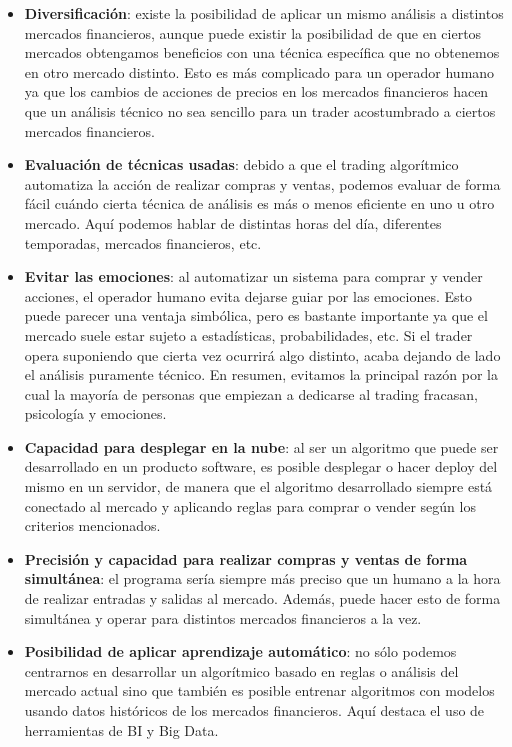 \begin{itemize}
	
	\item \textbf{Diversificación}: existe la posibilidad de aplicar un mismo análisis a distintos mercados financieros, aunque puede existir la posibilidad de que en ciertos mercados obtengamos beneficios con una técnica específica que no obtenemos en otro mercado distinto. Esto es más complicado para un operador humano ya que los cambios de acciones de precios en los mercados financieros hacen que un análisis técnico no sea sencillo para un trader acostumbrado a ciertos mercados financieros.
	\item \textbf{Evaluación de técnicas usadas}: debido a que el trading algorítmico automatiza la acción de realizar compras y ventas, podemos evaluar de forma fácil cuándo cierta técnica de análisis es más o menos eficiente en uno u otro mercado. Aquí podemos hablar de distintas horas del día, diferentes temporadas, mercados financieros, etc.
	\item \textbf{Evitar las emociones}: al automatizar un sistema para comprar y vender acciones, el operador humano evita dejarse guiar por las emociones. Esto puede parecer una ventaja simbólica, pero es bastante importante ya que el mercado suele estar sujeto a estadísticas, probabilidades, etc. Si el trader opera suponiendo que cierta vez ocurrirá algo distinto, acaba dejando de lado el análisis puramente técnico. En resumen, evitamos la principal razón por la cual la mayoría de personas que empiezan a dedicarse al trading fracasan, psicología y emociones.
	\item \textbf{Capacidad para desplegar en la nube}: al ser un algoritmo que puede ser desarrollado en un producto software, es posible desplegar o hacer deploy del mismo en un servidor, de manera que el algoritmo desarrollado siempre está conectado al mercado y aplicando reglas para comprar o vender según los criterios mencionados.
	\item \textbf{Precisión y capacidad para realizar compras y ventas de forma simultánea}: el programa sería siempre más preciso que un humano a la hora de realizar entradas y salidas al mercado. Además, puede hacer esto de forma simultánea y operar para distintos mercados financieros a la vez.
	\item \textbf{Posibilidad de aplicar aprendizaje automático}: no sólo podemos centrarnos en desarrollar un algorítmico basado en reglas o análisis del mercado actual sino que también es posible entrenar algoritmos con modelos usando datos históricos de los mercados financieros. Aquí destaca el uso de herramientas de BI y Big Data.
	
\end{itemize}

